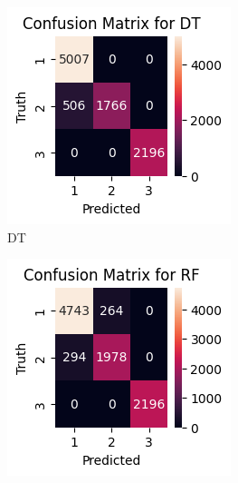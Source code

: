 \documentclass[conference]{IEEEtran}
\begin{document}
\begin{figure}[!t]
    \centering
    \begin{subfigure}[b]{0.32\columnwidth}
        \includegraphics[width=\textwidth]{confusion_matrix_dt.png}
        \caption{DT}\label{fig:cm_dt}
    \end{subfigure}
    \hfill
    \begin{subfigure}[b]{0.32\columnwidth}
        \includegraphics[width=\textwidth]{confusion_matrix_rf.png}

\end{subfigure}
\end{figure}
\end{document}
